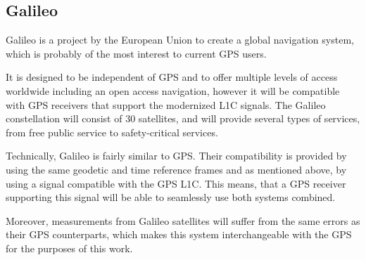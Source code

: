 \subsection{Galileo}
\label{sec:galileo}

Galileo \cite{galileo} is a project by the European Union to create a global navigation system, which
is probably of the most interest to current GPS users.

It is designed to be independent of GPS and to offer multiple levels of access worldwide
including an open access navigation, however
it will be compatible with GPS receivers that support the modernized L1C signals.
The Galileo constellation will consist of 30 satellites, and will provide several types of services,
from free public service to safety-critical services.

Technically, Galileo is fairly similar to GPS.
Their compatibility is provided by using the same geodetic and time reference frames
and as mentioned above, by using a signal compatible with the GPS L1C.
This means, that a GPS receiver supporting this signal will be able to seamlessly
use both systems combined.

Moreover, measurements from Galileo satellites will suffer from the same errors as
their GPS counterparts, which makes this system interchangeable with the GPS for the purposes
of this work.
